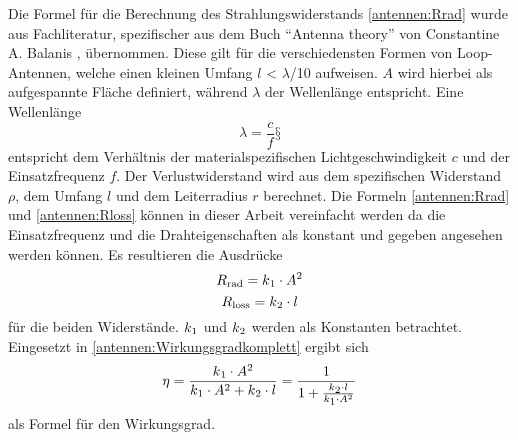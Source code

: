 Die Formel für die Berechnung des Strahlungswiderstands \eqref{antennen:Rrad} wurde aus Fachliteratur, spezifischer aus dem Buch ``Antenna theory'' von Constantine A. Balanis \cite{antennen:antennaTheory}, übernommen. Diese gilt für die verschiedensten Formen von Loop-Antennen, welche einen kleinen Umfang  $l$ < $\lambda$/10 aufweisen. $A$ wird hierbei als aufgespannte Fläche definiert, während $\lambda$ der Wellenlänge entspricht. Eine Wellenlänge \printbibliography
\begin{equation}
	\lambda=\frac{c}{f}§
	\label{antennen:Lambda}
\end{equation}
entspricht dem Verhältnis der materialspezifischen Lichtgeschwindigkeit $c$ und der Einsatzfrequenz $f$.
Der Verlustwiderstand wird aus dem spezifischen Widerstand $\rho$, dem Umfang $l$ und dem Leiterradius $r$ berechnet. Die Formeln \eqref{antennen:Rrad} und \eqref{antennen:Rloss} können in dieser Arbeit vereinfacht werden da die Einsatzfrequenz und die Drahteigenschaften als konstant und gegeben angesehen werden können. Es resultieren die Ausdrücke 
\begin{equation}
	R\textsubscript{rad}=k\textsubscript{1}\cdot{A^2}
	\label{antennen:Rrad_konst}
\end{equation}
\begin{equation}
	R\textsubscript{loss}=k\textsubscript{2}\cdot{l}
	\label{antennen:Rloss_konst}
\end{equation}
für die beiden Widerstände. $k\textsubscript{1}$ und $k\textsubscript{2}$ werden als Konstanten betrachtet. Eingesetzt in \eqref{antennen:Wirkungsgradkomplett} ergibt sich
\begin{equation}
	\eta=\frac{k\textsubscript{1}\cdot{A^2}}{k\textsubscript{1}\cdot{A^2}+{k\textsubscript{2}\cdot{l}}}=\frac{1}{1+\frac{k\textsubscript{2}\cdot{l}}{k\textsubscript{1}\cdot{A^2}}}
	\label{antennen:Wirkungsgradeingesetzt}
\end{equation}
als Formel für den Wirkungsgrad.
